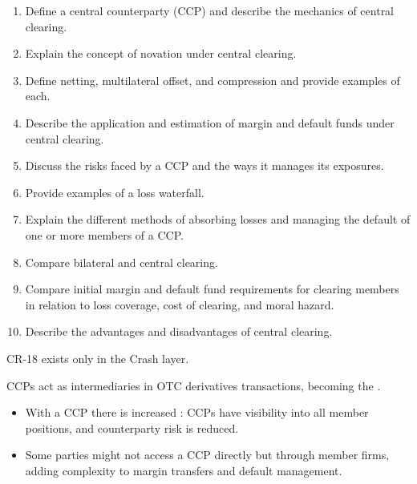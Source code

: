 
\begin{crkeybox}
\begin{enumerate}[label=\textbf{\alph*.},leftmargin=2em]
\item Define a central counterparty (CCP) and describe the mechanics of central clearing.
\item Explain the concept of novation under central clearing.
\item Define netting, multilateral offset, and compression and provide examples of each.
\item Describe the application and estimation of margin and default funds under central clearing.
\item Discuss the risks faced by a CCP and the ways it manages its exposures.
\item Provide examples of a loss waterfall.
\item Explain the different methods of absorbing losses and managing the default of one or more members of a CCP.
\item Compare bilateral and central clearing.
\item Compare initial margin and default fund requirements for clearing members in relation to loss coverage, cost of clearing, and moral hazard.
\item Describe the advantages and disadvantages of central clearing.
\end{enumerate}
\end{crkeybox}

\begin{crtrapbox}
CR-18 exists only in the Crash layer.
\end{crtrapbox}


CCPs act as intermediaries in OTC derivatives transactions, becoming the
.

\begin{itemize}
\item With a CCP there is increased : CCPs have visibility into
all member positions, and counterparty risk is reduced.
\item Some parties might not access a CCP directly but through member firms,
adding complexity to margin transfers and default management.
\end{itemize}

